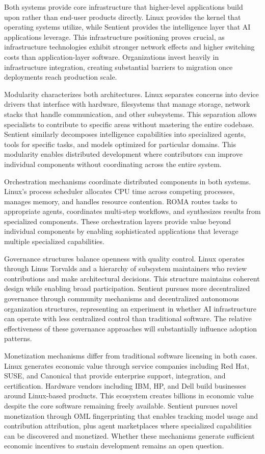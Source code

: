 Both systems provide core infrastructure that higher-level applications build upon rather than end-user products directly. Linux provides the kernel that operating systems utilize, while Sentient provides the intelligence layer that AI applications leverage. This infrastructure positioning proves crucial, as infrastructure technologies exhibit stronger network effects and higher switching costs than application-layer software. Organizations invest heavily in infrastructure integration, creating substantial barriers to migration once deployments reach production scale.

Modularity characterizes both architectures. Linux separates concerns into device drivers that interface with hardware, filesystems that manage storage, network stacks that handle communication, and other subsystems. This separation allows specialists to contribute to specific areas without mastering the entire codebase. Sentient similarly decomposes intelligence capabilities into specialized agents, tools for specific tasks, and models optimized for particular domains. This modularity enables distributed development where contributors can improve individual components without coordinating across the entire system.

Orchestration mechanisms coordinate distributed components in both systems. Linux's process scheduler allocates CPU time across competing processes, manages memory, and handles resource contention. ROMA routes tasks to appropriate agents, coordinates multi-step workflows, and synthesizes results from specialized components. These orchestration layers provide value beyond individual components by enabling sophisticated applications that leverage multiple specialized capabilities.

Governance structures balance openness with quality control. Linux operates through Linus Torvalds and a hierarchy of subsystem maintainers who review contributions and make architectural decisions. This structure maintains coherent design while enabling broad participation. Sentient pursues more decentralized governance through community mechanisms and decentralized autonomous organization structures, representing an experiment in whether AI infrastructure can operate with less centralized control than traditional software. The relative effectiveness of these governance approaches will substantially influence adoption patterns.

Monetization mechanisms differ from traditional software licensing in both cases. Linux generates economic value through service companies including Red Hat, SUSE, and Canonical that provide enterprise support, integration, and certification. Hardware vendors including IBM, HP, and Dell build businesses around Linux-based products. This ecosystem creates billions in economic value despite the core software remaining freely available. Sentient pursues novel monetization through OML fingerprinting that enables tracking model usage and contribution attribution, plus agent marketplaces where specialized capabilities can be discovered and monetized. Whether these mechanisms generate sufficient economic incentives to sustain development remains an open question.

